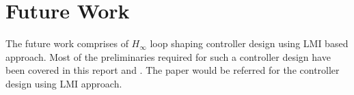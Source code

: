 \documentclass[a4paper,12pt]{article}
\begin{document}
\section{Future Work}
The future work comprises of $H_{\infty}$ loop shaping controller design using LMI based approach. Most of the preliminaries required for such a controller design have been covered in this report and \cite{prev}. The paper \cite{Pasca} would be referred for the controller design using LMI approach. 
\printbibliography 
\end{document}
